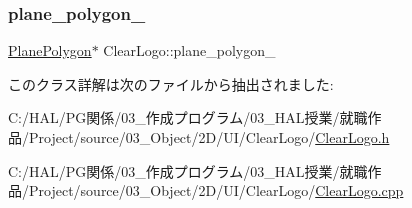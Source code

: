 \subsubsection{\texorpdfstring{plane\+\_\+polygon\+\_\+}{plane\_polygon\_}}
{\footnotesize\ttfamily \mbox{\hyperlink{class_plane_polygon}{Plane\+Polygon}}$\ast$ Clear\+Logo\+::plane\+\_\+polygon\+\_\+}



このクラス詳解は次のファイルから抽出されました\+:\begin{DoxyCompactItemize}
\item 
C\+:/\+H\+A\+L/\+P\+G関係/03\+\_\+作成プログラム/03\+\_\+\+H\+A\+L授業/就職作品/\+Project/source/03\+\_\+\+Object/2\+D/\+U\+I/\+Clear\+Logo/\mbox{\hyperlink{_clear_logo_8h}{Clear\+Logo.\+h}}\item 
C\+:/\+H\+A\+L/\+P\+G関係/03\+\_\+作成プログラム/03\+\_\+\+H\+A\+L授業/就職作品/\+Project/source/03\+\_\+\+Object/2\+D/\+U\+I/\+Clear\+Logo/\mbox{\hyperlink{_clear_logo_8cpp}{Clear\+Logo.\+cpp}}\end{DoxyCompactItemize}
